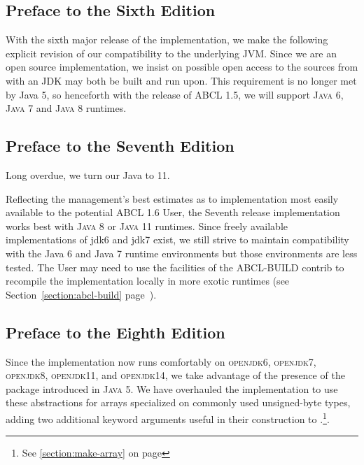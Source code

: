 \documentclass[10pt]{book}
\begin{document}
\subsection{Preface to the Sixth Edition}

With the sixth major release of the implementation, we make the
following explicit revision of our compatibility to the underlying
\textsc{JVM}.  Since we are an open source implementation, we insist
on possible open access to the sources from with an \textsc{JDK} may
both be built and run upon.  This requirement is no longer met by Java
5, so henceforth with the release of \textsc{ABCL} 1.5, we will
support \textsc{Java 6}, \textsc{Java 7} and \textsc{Java 8} runtimes.

\subsection{Preface to the Seventh Edition}

Long overdue, we turn our Java to 11.

Reflecting the management's best estimates as to implementation most
easily available to the potential \textsc{ABCL} 1.6 User, the Seventh
release implementation works best with \textsc{Java 8} or \textsc{Java 11}
runtimes.  Since freely available implementations of jdk6 and jdk7
exist, we still strive to maintain compatibility with the Java 6 and
Java 7 runtime environments but those environments are less tested.
The User may need to use the facilities of the \textsc{ABCL-BUILD} contrib to
recompile the implementation locally in more exotic runtimes (see
Section~\ref{section:abcl-build} page~\pageref{section:abcl-build}).


\subsection{Preface to the Eighth Edition}
Since the implementation now runs comfortably on \textsc{openjdk6},
\textsc{openjdk7}, \textsc{openjdk8}, \textsc{openjdk11}, and
\textsc{openjdk14}, we take advantage of the presence of the
 package introduced in \textsc{Java 5}.  We have
overhauled the implementation to use these abstractions for arrays
specialized on commonly used unsigned-byte types, adding two
additional keyword arguments useful in their construction to
.\footnote{See \ref{section:make-array} on page
\pageref{section:make-array}}.
\end{document}
